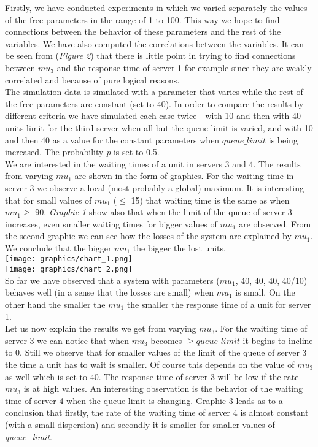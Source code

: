 \documentclass[12pt]{article}
\theoremstyle{plain}
\begin{document}
Firstly, we have conducted experiments in which we varied separately the values of
the free parameters in the range of 1 to 100. This way we hope to find connections
between the behavior of these parameters and the rest of the variables. We have
also computed the correlations between the variables. It can be seen from
(\emph{Figure 2}) that there is little point in trying to find connections
between $mu_3$ and the response time of server 1 for example since they are
weakly correlated and because of pure logical reasons.\\
The simulation data is simulated with a parameter that varies while the rest of
the free parameters are constant (set to 40). In order to compare the results by
different criteria we have simulated each case twice - with 10 and then with 40
units limit for the third server when all but the queue limit is varied, and with
10 and then 40 as a value for the constant parameters when $queue\_limit$ is
being increased. The probability \emph{p} is set to 0.5.\\
We are interested in the waiting times of a unit in servers 3 and 4. The results
from varying $mu_1$ are shown in the form of graphics. For the waiting time in
server 3 we observe a local (most probably a global) maximum. It is interesting
that for small values of $mu_1$ ($\le$ 15) that waiting time is the same as when
$mu_1 \ge$ 90. \emph{Graphic 1} show also that when the limit of the queue of
server 3 increases, even smaller waiting times for bigger values of $mu_1$ are
observed. From the second graphic we can see how the losses of the system are
explained by $mu_1$. We conclude that the bigger $mu_1$ the bigger the lost
units.\\

\texttt{[image: graphics/chart\_1.png]}\\
\texttt{[image: graphics/chart\_2.png]}\\

So far we have observed that a system with parameters ($mu_1$, 40, 40, 40,
40/10) behaves well (in a sense that the losses are small) when $mu_1$ is small.
On the other hand the smaller the $mu_1$ the smaller the response time of a unit
for server 1.\\
Let us now explain the results we get from varying $mu_3$. For the waiting time
of server 3 we can notice that when $mu_3$ becomes $\ge queue\_limit$ it begins
to incline to 0. Still we observe that for smaller values of the limit of the queue
of server 3 the time a unit has to wait is smaller. Of course this depends on the
value of $mu_3$ as well which is set to 40. The response time of server 3 will be
low if the rate $mu_3$ is at high values. An interesting observation is the behavior
of the waiting time of server 4 when the queue limit is changing. Graphic 3 leads
as to a conclusion that firstly, the rate of the waiting time of server 4 is almost
constant (with a small dispersion) and secondly it is smaller for smaller values
of \emph{queue\_limit}.\\
\end{document}
